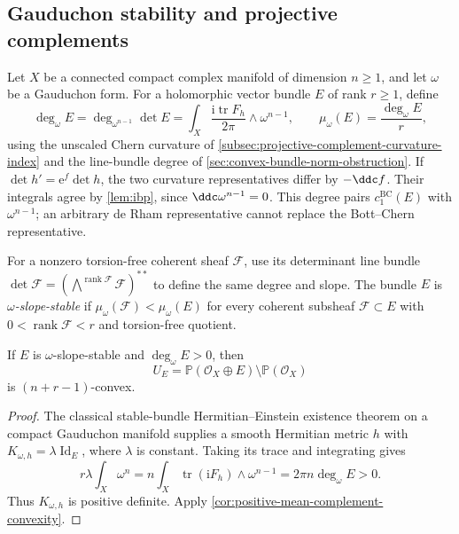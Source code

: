 \subsection{Gauduchon stability and projective complements}
\label{subsec:gauduchon-stability-complements}

Let $X$ be a connected compact complex manifold of dimension $n\geq1$, and let $\omega$ be a Gauduchon form. For a holomorphic vector bundle $E$ of rank $r\geq1$, define
\[
 \deg_\omega E=\deg_{\omega^{n-1}}\det E
 =\int_X\frac{\mathrm i\operatorname{tr}F_h}{2\pi}\wedge\omega^{n-1},
 \qquad \mu_\omega(E)=\frac{\deg_\omega E}{r},
\]
using the unscaled Chern curvature of \cref{subsec:projective-complement-curvature-index} and the line-bundle degree of \cref{sec:convex-bundle-norm-obstruction}. If $\det h'=\mathrm e^f\det h$, the two curvature representatives differ by $-\ddc f$. Their integrals agree by \cref{lem:ibp}, since $\ddc\omega^{n-1}=0$. This degree pairs $c_1^{\mathrm{BC}}(E)$ with $\omega^{n-1}$; an arbitrary de Rham representative cannot replace the Bott--Chern representative.

For a nonzero torsion-free coherent sheaf $\mathcal F$, use its determinant line bundle $\det\mathcal F=(\bigwedge^{\operatorname{rank}\mathcal F}\mathcal F)^{**}$ to define the same degree and slope. The bundle $E$ is \emph{$\omega$-slope-stable} if $\mu_\omega(\mathcal F)<\mu_\omega(E)$ for every coherent subsheaf $\mathcal F\subset E$ with $0<\operatorname{rank}\mathcal F<r$ and torsion-free quotient.

\begin{proposition}\label{prop:gauduchon-stable-complement}
If $E$ is $\omega$-slope-stable and $\deg_\omega E>0$, then
\[
 U_E=\mathbb P(\mathcal O_X\oplus E)\setminus\mathbb P(\mathcal O_X)
\]
is $(n+r-1)$-convex.
\end{proposition}
\begin{proof}
The classical stable-bundle Hermitian--Einstein existence theorem on a compact Gauduchon manifold supplies a smooth Hermitian metric $h$ with $K_{\omega,h}=\lambda\operatorname{Id}_E$, where $\lambda$ is constant. Taking its trace and integrating gives
\[
 r\lambda\int_X\omega^n
 =n\int_X\operatorname{tr}(\mathrm iF_h)\wedge\omega^{n-1}
 =2\pi n\deg_\omega E>0.
\]
Thus $K_{\omega,h}$ is positive definite. Apply \cref{cor:positive-mean-complement-convexity}.
\end{proof}

